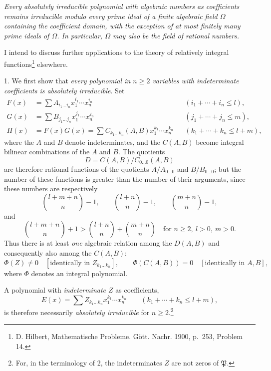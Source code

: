 \documentclass[11pt]{article}
\begin{document}
\emph{Every absolutely irreducible polynomial with algebraic numbers as coefficients remains irreducible modulo every prime ideal of a finite algebraic field $\Omega$ containing the coefficient domain, with the exception of at most finitely many prime ideals of $\Omega$. In particular, $\Omega$ may also be the field of rational numbers.}

I intend to discuss further applications to the theory of relatively integral functions\footnote{D. Hilbert, Mathematische Probleme. Gött. Nachr. 1900, p.~253, Problem 14.} elsewhere.

1. We first show that \emph{every polynomial in $n\ge2$ variables with indeterminate coefficients is absolutely irreducible}. Set
\begin{equation}
\begin{aligned}
F(x)&=\sum A_{i_1\ldots i_n}x_1^{i_1}\cdots x_n^{i_n} &&(i_1+\cdots+i_n\le l),\\
G(x)&=\sum B_{j_1\ldots j_n}x_1^{j_1}\cdots x_n^{j_n} &&(j_1+\cdots+j_n\le m),\\
H(x)&=F(x)G(x)=\sum C_{k_1\ldots k_n}(A,B)x_1^{k_1}\cdots x_n^{k_n} &&(k_1+\cdots+k_n\le l+m),
\end{aligned}
\tag{1}
\end{equation}
where the $A$ and $B$ denote indeterminates, and the $C(A,B)$ become integral bilinear combinations of the $A$ and $B$. The quotients
\[
D=C(A,B)/C_{0\ldots0}(A,B)
\]
are therefore rational functions of the quotients $A/A_{0\ldots0}$ and $B/B_{0\ldots0}$; but the number of these functions is greater than the number of their arguments, since these numbers are respectively
\[
\binom{l+m+n}{n}-1,
\qquad
\binom{l+n}{n}-1,
\qquad
\binom{m+n}{n}-1,
\]
and
\[
\binom{l+m+n}{n}+1>
\binom{l+n}{n}+\binom{m+n}{n}
\quad\text{for } n\ge2,\ l>0,\ m>0.
\]
Thus there is at least \emph{one} algebraic relation among the $D(A,B)$ and consequently also among the $C(A,B)$:
\begin{equation}
 \Phi(Z)\ne0\quad[\text{identically in }Z_{k_1\ldots k_n}],
 \qquad
 \Phi(C(A,B))=0\quad[\text{identically in }A,B],
\tag{2}
\end{equation}
where $\Phi$ denotes an integral polynomial.

A polynomial with \emph{indeterminate $Z$} as coefficients,
\begin{equation}
 E(x)=\sum Z_{k_1\ldots k_n}x_1^{k_1}\cdots x_n^{k_n}
 \qquad(k_1+\cdots+k_n\le l+m),
\tag{3}
\end{equation}
is therefore necessarily \emph{absolutely irreducible} for $n\ge2$.\footnote{For, in the terminology of 2, the indeterminates $Z$ are not zeros of $\mathfrak P$.}
\end{document}
